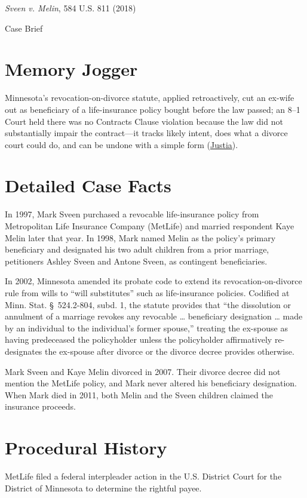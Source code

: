 \documentclass[12pt]{article}
\begin{document}
\begin{center}
{\LARGE \textit{Sveen v. Melin}, 584 U.S. 811 (2018)\par}
\vspace{0.8em}
{\large Case Brief\par}
\end{center}
\vspace{1em}

\section{Memory Jogger}
Minnesota's revocation-on-divorce statute, applied retroactively, cut an ex-wife out as beneficiary of a life-insurance policy bought before the law passed; an 8--1 Court held there was no Contracts Clause violation because the law did not substantially impair the contract---it tracks likely intent, does what a divorce court could do, and can be undone with a simple form (\href{https://supreme.justia.com/cases/federal/us/584/16-1432/}{Justia}).

\section{Detailed Case Facts}
In 1997, Mark Sveen purchased a revocable life-insurance policy from Metropolitan Life Insurance Company (MetLife) and married respondent Kaye Melin later that year. In 1998, Mark named Melin as the policy's primary beneficiary and designated his two adult children from a prior marriage, petitioners Ashley Sveen and Antone Sveen, as contingent beneficiaries.

In 2002, Minnesota amended its probate code to extend its revocation-on-divorce rule from wills to ``will substitutes'' such as life-insurance policies. Codified at Minn. Stat. \S~524.2-804, subd. 1, the statute provides that ``the dissolution or annulment of a marriage revokes any revocable \ldots{} beneficiary designation \ldots{} made by an individual to the individual's former spouse,'' treating the ex-spouse as having predeceased the policyholder unless the policyholder affirmatively re-designates the ex-spouse after divorce or the divorce decree provides otherwise.

Mark Sveen and Kaye Melin divorced in 2007. Their divorce decree did not mention the MetLife policy, and Mark never altered his beneficiary designation. When Mark died in 2011, both Melin and the Sveen children claimed the insurance proceeds.

\section{Procedural History}
MetLife filed a federal interpleader action in the U.S. District Court for the District of Minnesota to determine the rightful payee.
\end{document}
